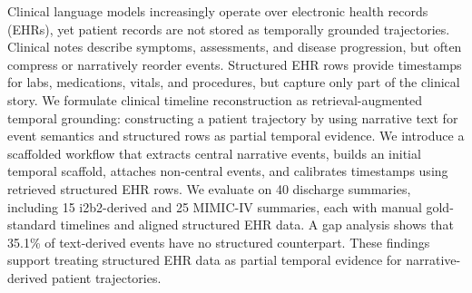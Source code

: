 \begin{ChEightAbstract}
Clinical language models increasingly operate over electronic health records (EHRs), yet patient records are not stored as temporally grounded trajectories. Clinical notes describe symptoms, assessments, and disease progression, but often compress or narratively reorder events. Structured EHR rows provide timestamps for labs, medications, vitals, and procedures, but capture only part of the clinical story. We formulate clinical timeline reconstruction as retrieval-augmented temporal grounding: constructing a patient trajectory by using narrative text for event semantics and structured rows as partial temporal evidence. We introduce a scaffolded workflow that extracts central narrative events, builds an initial temporal scaffold, attaches non-central events, and calibrates timestamps using retrieved structured EHR rows. We evaluate on 40 discharge summaries, including 15 i2b2-derived and 25 MIMIC-IV summaries, each with manual gold-standard timelines and aligned structured EHR data. 
A gap analysis shows that 35.1\% of text-derived events have no structured counterpart. These findings support treating structured EHR data as partial temporal evidence for narrative-derived patient trajectories.
\end{ChEightAbstract}







